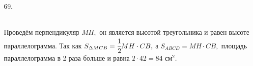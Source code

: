 69. \begin{figure}[ht!]
\end{figure}\\
Проведём перпендикуляр $MH,$ он является высотой треугольника и равен высоте параллелограмма. Так как $S_{\Delta MCB}=\cfrac{1}{2}MH\cdot CB,$ а $S_{ABCD}=MH\cdot CB,$ площадь параллелограмма в 2 раза больше и равна $2\cdot42=84\text{ см}^2.$\\
